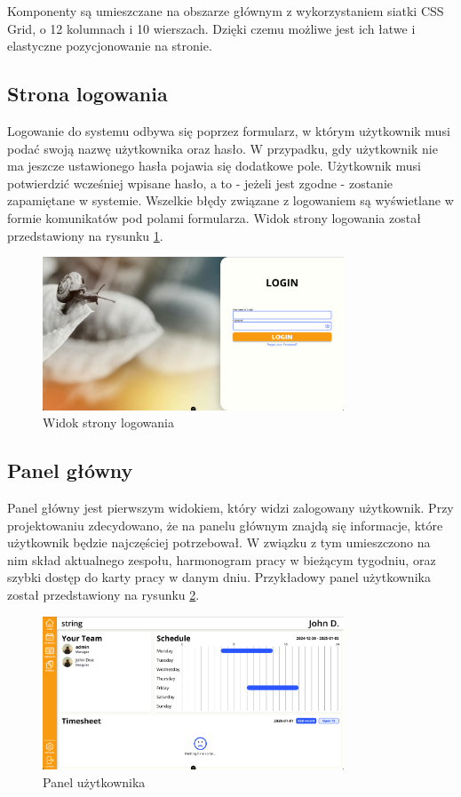 Komponenty są umieszczane na obszarze głównym z wykorzystaniem siatki CSS Grid, o 12 kolumnach i 10 wierszach. Dzięki czemu możliwe jest ich łatwe i elastyczne pozycjonowanie na stronie.

\subsection{Strona logowania}

Logowanie do systemu odbywa się poprzez formularz, w którym użytkownik musi podać swoją nazwę użytkownika oraz hasło. W przypadku, gdy użytkownik nie ma jeszcze ustawionego hasła pojawia się dodatkowe pole. Użytkownik musi potwierdzić wcześniej wpisane hasło, a to - jeżeli jest zgodne - zostanie zapamiętane w systemie. Wszelkie błędy związane z logowaniem są wyświetlane w formie komunikatów pod polami formularza.
Widok strony logowania został przedstawiony na rysunku \ref{fig:loginPage}.

\begin{figure}[H]
    \centering
    \includegraphics[width=0.8\textwidth, frame]{graf/front/loginPage.png}
    \caption{Widok strony logowania}
    \label{fig:loginPage}
\end{figure}

\subsection{Panel główny}

Panel główny jest pierwszym widokiem, który widzi zalogowany użytkownik. Przy projektowaniu zdecydowano, że na panelu głównym znajdą się informacje, które użytkownik będzie najczęściej potrzebował. W związku z tym umieszczono na nim skład aktualnego zespołu, harmonogram pracy w bieżącym tygodniu, oraz szybki dostęp do karty pracy w danym dniu. Przykładowy panel użytkownika został przedstawiony na rysunku \ref{fig:userDashboard}.

\begin{figure}[H]
    \centering
    \includegraphics[width=0.8\textwidth, frame]{graf/userDashboard.png}
    \caption{Panel użytkownika}
    \label{fig:userDashboard}
\end{figure}


